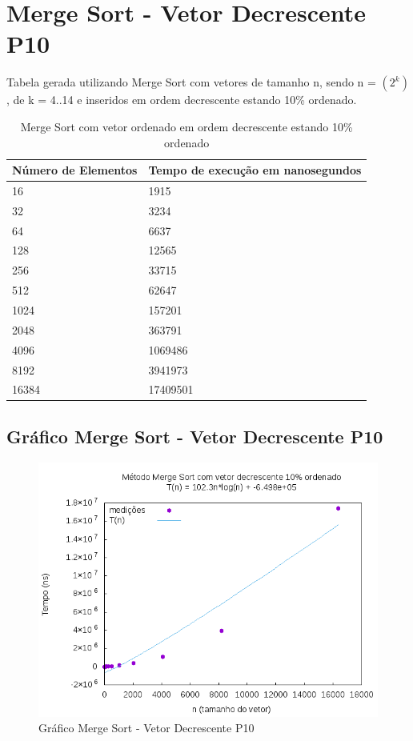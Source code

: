 \documentclass[12pt,a4paper,twoside]{report}
\begin{document}
\section{Merge Sort - Vetor Decrescente P10}
Tabela gerada utilizando Merge Sort com vetores de tamanho n, sendo n = $(2^k)$, de k = 4..14 e inseridos em ordem decrescente estando 10\% ordenado.
\begin{table}[H]
\centering
\caption{Merge Sort com vetor ordenado em ordem decrescente estando 10\% ordenado}
\label{my-label}
\begin{tabular}{|l|l|}
\hline
\multicolumn{1}{|c|}{\textbf{Número de Elementos}} & \multicolumn{1}{c|}{\textbf{Tempo de execução em nanosegundos}} \\ \hline
16 & 1915 \\ \hline
32 & 3234 \\ \hline
64 & 6637 \\ \hline
128 & 12565 \\ \hline
256 & 33715 \\ \hline
512 & 62647 \\ \hline
1024 & 157201 \\ \hline
2048 & 363791 \\ \hline
4096 & 1069486 \\ \hline
8192 & 3941973 \\ \hline
16384 & 17409501 \\ \hline
\end{tabular}
\end{table}

\subsection{Gráfico Merge Sort - Vetor Decrescente P10}
\begin{figure}[H]
    \centering
    \includegraphics[width=0.7\linewidth]{graficos/MergeSort/vIntDecrescenteP10/vIntDecrescenteP10.png}
  \caption{Gráfico Merge Sort - Vetor Decrescente P10}
\end{figure}
\end{document}
